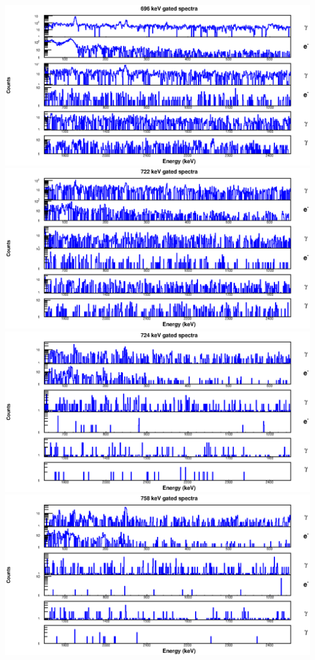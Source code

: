 \begin{landscape}
\includegraphics[scale=1.2]{154Gd_Appendix/696_combined.eps}
\includegraphics[scale=1.2]{154Gd_Appendix/722_combined.eps}
\includegraphics[scale=1.2]{154Gd_Appendix/724_combined.eps}
\includegraphics[scale=1.2]{154Gd_Appendix/758_combined.eps}

\end{landscape}
